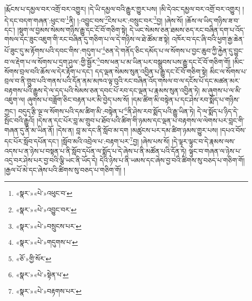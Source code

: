 །རྨོངས་པ་དམྱལ་བར་འགྲོ་བར་འགྱུར། །དེ་ཡི་དམྱལ་བའི་རྒྱུར་གྱུར་པས། །མི་དེའང་དམྱལ་བར་འགྲོ་བར་འགྱུར། །དེ་དང་བདག་གཞན་:ཕུང་བ་\footnote{«སྣར་»«པེ་»འཕུང་བ་}ནི། །:འབྱུང་བས་\footnote{«སྣར་»«པེ་»འབྱུང་བར་}ངེས་པར་:བསྲུང་བར་\footnote{«སྣར་»«པེ་»བསྲུངས་པར་}བྱ། །ཞེས་སོ། །ཆོས་ལ་ཡིད་གཉིས་ཟ་བ་དང་། །སྡུག་ལ་བྱམས་སེམས་གཉིས་རྒྱུ་དང་ངོ་བོ་གཅིག་སྟེ། དེ་ཡང་སེམས་ཅན་ཐམས་ཅད་རང་བཞིན་དག་པ་འོད་གསལ་དང་ཟུང་འཇུག་གི་རང་བཞིན་དུ་གཅིག་པ་ལ་དེ་གཉིས་ལ་ཐེ་ཚོམ་ཟ་སྟེ། འཁོར་བ་དང་ཞི་བའི་ཕྱག་རྒྱ་ཆེན་པོ་ཟུང་དུ་མ་རྟོགས་པའི་དབང་གིས་:གདུག་པ་\footnote{«སྣར་»«པེ་»གདུགས་པ་}ཅན་དེ་གནོད་ཅིང་དམོད་པ་ལ་སོགས་པ་བྱང་ཆུབ་ཀྱི་རྐྱེན་དུ་བྱུང་བ་ལ་རྡེག་པ་ལ་སོགས་པ་དྲག་ཤུལ་:གྱི་སྦྱོར་\footnote{«ཅོ་»གྱི་སོར་}བས་ཕན་པ་མ་ཡིན་པར་བསྒྲུབས་པས་རྒྱུ་དང་ངོ་བོ་གཅིག་གོ། །མིང་སོགས་བྲལ་བའི་ཆོས་ལ་དེར་རྟོག་པ་དང་། དད་ལྡན་སེམས་སུན་འབྱིན་པ་རྒྱུ་དང་ངོ་བོ་གཅིག་སྟེ། མིང་ལ་སོགས་པ་བྲལ་བ་ནི་གྲུབ་པའི་གནས་པའི་དོན་ནམ་མཁའ་ལྟ་བུའི་རང་བཞིན་འོད་གསལ་བ་ལ་དངོས་པོ་དང་མཚན་མར་བརྟགས་པའི་རྒྱུས་དེ་ལ་དད་པའི་སེམས་ཅན་དབང་པོ་རབ་དང་ལྡན་པ་རྣམས་སུན་འབྱིན་ཏེ། མ་ཞུགས་པ་ལ་མི་འཇུག་ལ། ཞུགས་པ་བཟློག་ཅིང་བརྟན་པར་མི་བྱེད་པས་སོ། །དམ་ཚིག་མི་བསྟེན་པ་དང་ཤེས་རབ་སྨོད་པ་གཉིས་ཀྱང་། བདུད་རྩི་ལྔ་ལ་སོགས་པའི་དམ་ཚིག་མི་:བསྟེན་པ་\footnote{«སྣར་»«པེ་»སྟེན་པ་}ནི་ཤེས་རབ་སྨོད་པའི་རྒྱུ་ཡིན་ཏེ། དེ་ལ་སྨོད་པ་ཉིད་དེ་སྤོང་བའི་རྒྱུའོ། །དེས་ན་དང་པོར་བླ་མ་གྲུབ་པ་ཐོབ་པའི་ཚིག་གི་ཉམས་དང་ལྡན་པ་བརྟགས་ལ་ལེགས་པར་བླང་གི་གཞན་དུ་ནི་མ་ཡིན་ནོ། །དེས་ན། བླ་མ་དང་ནི་སློབ་མ་དག །མཚུངས་པར་དམ་ཚིག་ཉམས་གྱུར་པས། །དཔའ་བོས་དང་པོར་སློབ་དཔོན་དང་། །སློབ་མའི་འབྲེལ་པ་:བརྟག་པར་\footnote{«སྣར་»«པེ་»བརྟགས་པར་}བྱ། །ཞེས་པས་སོ། །དེ་ལྟར་ལྟུང་བ་དེ་རྣམས་ལས་འདས་པ་ན་ཉེས་པ་བསྟན་པ་ནི་སློབ་དཔོན་ལ་སྨོད་པ་དེ་ཞེས་པ་ནི་མཚོན་པའི་དོན་ཏེ། ལྟུང་བ་གཞན་ལ་ཉེས་པ་འདྲ་བར་ཤེས་པར་བྱ་བའི་ལྕི་ཡང་ནི་ཡོད་དེ། དེའི་ཉེས་པ་ནི་ཡམས་དང་ཞེས་བྱ་བའི་ཚིགས་སུ་བཅད་པ་གཅིག་གོ། །རྒྱལ་པོ་མེ་དང་ཞེས་པའི་ཚིགས་སུ་བཅད་པ་གཅིག་གོ། །
